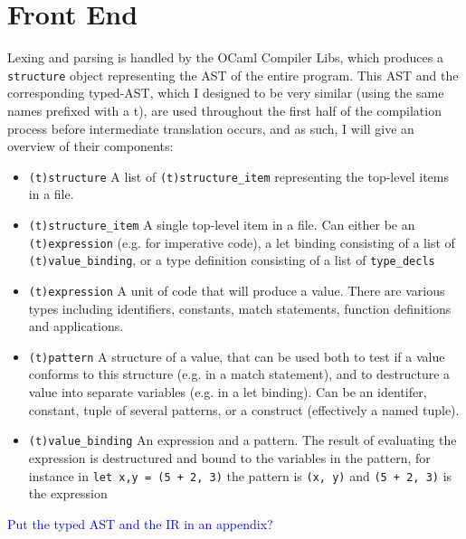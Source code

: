 \documentclass[12pt,twoside,notitlepage]{report}
\newcommand{\textinline}{\texttt}
\newcommand{\camlinline}{\texttt}
\newcommand\note[1]{\textcolor{blue}{#1}}
\begin{document}
\section{Front End}
Lexing and parsing is handled by the OCaml Compiler Libs, which produces a \textinline{structure} object representing the AST of the entire program. This AST and the corresponding typed-AST, which I designed to be very similar (using the same names prefixed with a t), are used throughout the first half of the compilation process before intermediate translation occurs, and as such, I will give an overview of their components:
\begin{itemize}
	\item \textinline{(t)structure} A list of \textinline{(t)structure_item} representing the top-level items in a file.
	\item \textinline{(t)structure_item} A single top-level item in a file. Can either be an \textinline{(t)expression} (e.g. for imperative code), a let binding consisting of a list of \textinline{(t)value_binding}, or a type definition consisting of a list of \textinline{type_decls}
	\item \textinline{(t)expression} A unit of code that will produce a value. There are various types including identifiers, constants, match statements, function definitions and applications.
	\item \textinline{(t)pattern} A structure of a value, that can be used both to test if a value conforms to this structure (e.g. in a match statement), and to destructure a value into separate variables (e.g. in a let binding). Can be an identifer, constant, tuple of several patterns, or a construct (effectively a named tuple).
	\item \textinline{(t)value_binding} An expression and a pattern. The result of evaluating the expression is destructured and bound to the variables in the pattern, for instance in \camlinline{let x,y = (5 + 2, 3)} the pattern is \camlinline{(x, y)} and \camlinline{(5 + 2, 3)} is the expression
\end{itemize}
\note{Put the typed AST and the IR in an appendix?}
\end{document}
